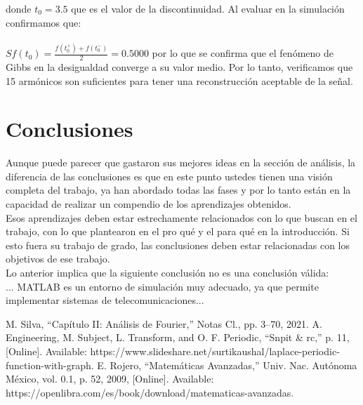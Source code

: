 \documentclass[11pt]{article}
\begin{document}
    donde $t_0=3.5$ que es el valor de la discontinuidad. Al evaluar en la simulación 
    confirmamos que:\\
    \\
     $Sf(t_0)=\frac{f(t_0^+)+f(t_0^-)}{2}=0.5000$ por lo que se confirma que el fenómeno de Gibbs 
     en la desigualdad converge a su valor medio. Por lo tanto, verificamos que 15 armónicos 
     son suficientes para tener una reconstrucción aceptable de la señal.

\section*{Conclusiones}
    Aunque puede parecer que gastaron sus mejores ideas en la sección de análisis, la 
    diferencia de las conclusiones es que en este punto ustedes tienen una visión completa 
    del trabajo, ya han abordado todas las fases y por lo tanto están en la capacidad de 
    realizar un compendio de los aprendizajes obtenidos.\\
    Esos aprendizajes deben estar estrechamente relacionados con lo que buscan en el 
    trabajo, con lo que plantearon en el pro qué y el para qué en la introducción. Si esto fuera 
    su trabajo de grado, las conclusiones deben estar relacionadas con los objetivos de ese 
    trabajo.\\
    Lo anterior implica que la siguiente conclusión no es una conclusión válida:\\
    ... MATLAB es un entorno de simulación muy adecuado, ya que permite implementar 
    sistemas de telecomunicaciones...

\begin{thebibliography}{99}
        M. Silva, “Capítulo II: Análisis de Fourier,” Notas Cl., pp. 3–70, 2021.
        A. Engineering, M. Subject, L. Transform, and O. F. Periodic, “Snpit \& rc,” p. 11, [Online]. Available: https://www.slideshare.net/surtikaushal/laplace-periodic-function-with-graph.
        E. Rojero, “Matemáticas Avanzadas,” Univ. Nac. Autónoma México, vol. 0.1, p. 52, 2009, [Online]. Available: https://openlibra.com/es/book/download/matematicas-avanzadas.
\end{thebibliography}
\end{document}
